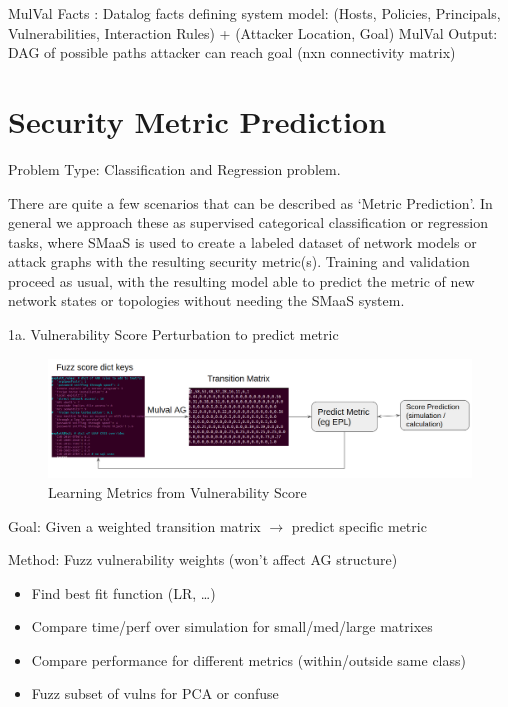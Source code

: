 MulVal Facts : Datalog facts defining system model: (Hosts, Policies, Principals, Vulnerabilities, Interaction Rules) + (Attacker Location, Goal)
MulVal Output: DAG of possible paths attacker can reach goal (nxn connectivity matrix)

\section{Security Metric Prediction}

Problem Type: Classification and Regression problem.

There are quite a few scenarios that can be described as ‘Metric Prediction’. In general we approach these as supervised categorical classification or regression tasks, where SMaaS is used to create a labeled dataset of network models or attack graphs with the resulting security metric(s). Training and validation proceed as usual, with the resulting model able to predict the metric of new network states or topologies without needing the SMaaS system.

1a. Vulnerability Score Perturbation to predict metric


\begin{figure}[ht]
\centering
\includegraphics[width=.9\textwidth]{resource/img/ch_future/1a.png}
\caption{Learning Metrics from Vulnerability Score}
\label{fig:final:1a}
\end{figure} 

Goal: Given a weighted transition matrix $\longrightarrow$ predict specific metric

Method: Fuzz vulnerability weights (won't affect AG structure)
\begin{itemize}
\item Find best fit function (LR, …)
\item Compare time/perf over simulation for small/med/large matrixes
\item Compare performance for different metrics (within/outside same class)
\item Fuzz subset of vulns for PCA or confuse
\end{itemize}

